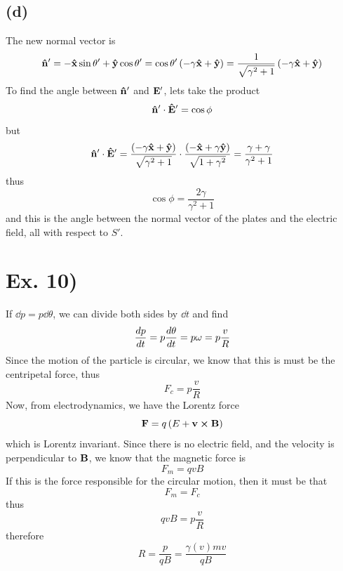 \documentclass[oneside, 10pt, notitlepage]{book}
\begin{document}
\subsection*{(d)}

The new normal vector is 
\begin{equation}
    \vu{n}' = -\vu{x}\sin\theta' + \vu{y}\cos\theta' = \cos\theta'\left(-\gamma\vu{x}+\vu{y}\right) = \frac{1}{\sqrt{\gamma^2+1}}\left(-\gamma\vu{x}+\vu{y}\right)
\end{equation}
To find the angle between \(\vu{n}'\) and \(\vb{E}'\), lets take the product 
\begin{equation}
    \vu{n}'\cdot \vu{E}' = \cos\phi
\end{equation}
but 
\begin{equation}
    \vu{n}'\cdot \vu{E}' = \frac{\left(-\gamma\vu{x}+\vu{y}\right)}{\sqrt{\gamma^2+1}}\cdot \frac{\left(-\vu{x}+\gamma\vu{y}\right)}{\sqrt{1+\gamma^2}} = \frac{\gamma+\gamma}{\gamma^2+1}
\end{equation}
thus 
\begin{equation}
    \cos \phi = \frac{2\gamma}{\gamma^2+1}
\end{equation}
and this is the angle between the normal vector of the plates and the electric field, all with respect to \(S'\).

\section*{Ex. 10)}
If \(\dd{p} = p \dd{\theta}\), we can divide both sides by \(\dd{t}\) and find
\begin{equation}
    \dv{p}{t} = p \dv{\theta}{t} = p \omega = p \frac{v}{R}
\end{equation}
Since the motion of the particle is circular, we know that this is must be the centripetal force, thus
\begin{equation}
    F_c = p \frac{v}{R}
\end{equation}
Now, from electrodynamics, we have the Lorentz force
\begin{equation}
    \vb{F} = q\left(E + \vb{v}\cross \vb{B}\right)
\end{equation}
which is Lorentz invariant. Since there is no electric field, and the velocity is perpendicular to \(\vb{B}\), we know that the magnetic force is
\begin{equation}
    F_m = q v B
\end{equation}
If this is the force responsible for the circular motion, then it must be that
\begin{equation}
    F_m = F_c
\end{equation}
thus
\begin{equation}
    q v B = p \frac{v}{R}
\end{equation}
therefore
\begin{equation}
    R = \frac{p}{q B} = \frac{\gamma(v) m v}{q B}
\end{equation}
\end{document}
